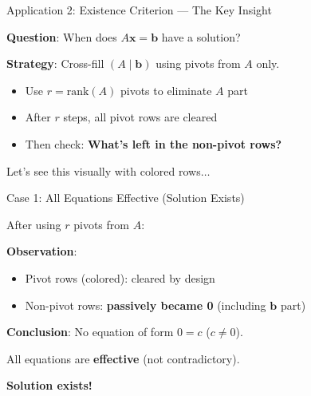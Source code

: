 \documentclass[10pt]{beamer}
\theoremstyle{definition}
\newcommand{\x}[1]{\alert{\textbf{#1}}}
\begin{document}
\begin{frame}{Application 2: Existence Criterion — The Key Insight}

\x{Question}: When does $A\mathbf{x} = \mathbf{b}$ have a solution?

\vspace{1em}

\x{Strategy}: Cross-fill $(A \mid \mathbf{b})$ using pivots from $A$ only.

\vspace{0.5em}

\begin{itemize}
\item Use $r = \text{rank}(A)$ pivots to eliminate $A$ part
\item After $r$ steps, all pivot rows are cleared
\item Then check: \x{What's left in the non-pivot rows?}
\end{itemize}

\vspace{1em}

Let's see this visually with colored rows$\ldots$

\end{frame}

\begin{frame}[fragile]{Case 1: All Equations Effective (Solution Exists)}

After using $r$ pivots from $A$:

\begin{center}
\end{center}

\vspace{0.5em}

\x{Observation}:
\begin{itemize}
\item Pivot rows (colored): cleared by design
\item Non-pivot rows: \x{passively became 0} (including $\mathbf{b}$ part)
\end{itemize}

\x{Conclusion}: No equation of form $0 = c$ ($c \neq 0$).

All equations are \textbf{effective} (not contradictory).

\x{Solution exists!}

\end{frame}
\end{document}
